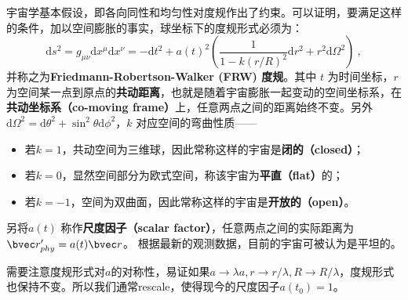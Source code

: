 
宇宙学基本假设，即各向同性和均匀性对度规作出了约束。可以证明，要满足这样的条件，加以空间膨胀的事实，球坐标下的度规形式必须为：
\begin{equation}
\mathrm{d}s^2=g_{\mu\nu}\mathrm{d}x^{\mu}\mathrm{d}x^{\nu}=-\mathrm{d}t^2+a(t)^2 \left( \frac{1}{1-k(r/R)^2}\mathrm{d}r^2+r^2 \mathrm{d} \Omega^2\right)~,
\end{equation}
并称之为\textbf{Friedmann-Robertson-Walker (FRW) 度规}。其中 $t$ 为时间坐标，$r$ 为空间某一点到原点的\textbf{共动距离}，也就是随着宇宙膨胀一起变动的空间坐标系，在\textbf{共动坐标系（co-moving frame）}上，任意两点之间的距离始终不变。另外$\mathrm{d} \Omega^2 =\mathrm{d} \theta^2 + \sin^2\theta\mathrm{d} \phi^2 $，$k$ 对应空间的弯曲性质——
\begin{itemize}
\item 若$k=1$，共动空间为三维球，因此常称这样的宇宙是\textbf{闭的（closed）}；
\item 若$k=0$，显然空间部分为欧式空间，称该宇宙为\textbf{平直（flat）}的；
\item 若$k=-1$，空间为双曲面，因此常称这样的宇宙是\textbf{开放的（open）}。
\end{itemize}
 另将$a(t)$ 称作\textbf{尺度因子（scalar factor）}，任意两点之间的实际距离为$\bvec r'_{phy}=a(t)\bvec r$。
根据最新的观测数据，目前的宇宙可被认为是平坦的。

需要注意度规形式对$a$的对称性，易证如果$a\rightarrow \lambda a,r\rightarrow r/\lambda, R\rightarrow R/\lambda$，度规形式也保持不变。所以我们通常rescale，使得现今的尺度因子$a(t_0)=1$。


